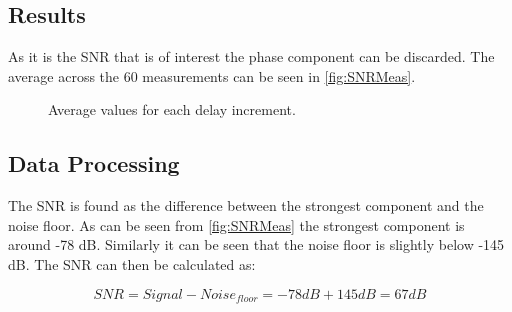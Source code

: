 \subsection{Results}
As it is the SNR that is of interest the phase component can be discarded. The average across the 60 measurements can be seen in \autoref{fig:SNRMeas}.

\begin{figure}[H]
\centering

\caption{Average values for each delay increment.}
\label{fig:SNRMeas}
\end{figure}

\subsection{Data Processing}
The SNR is found as the difference between the strongest component and the noise floor. As can be seen from \autoref{fig:SNRMeas} the strongest component is around -78 dB. Similarly it can be seen that the noise floor is slightly below -145 dB. The SNR can then be calculated as:

\begin{equation}
SNR = Signal - Noise_{floor} = -78dB + 145dB = 67 dB
\end{equation}
